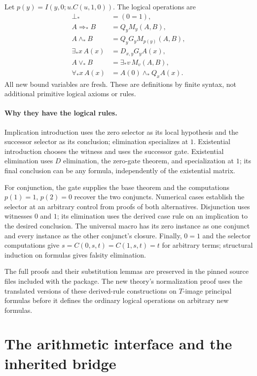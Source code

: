 \documentclass[11pt,a4paper]{article}
\theoremstyle{definition}
\begin{document}
Let $p(y)=I(y,0;u.C(u,1,0))$. The logical operations are
\[
\begin{aligned}
\bot_*&=(0=1),\\
A\Rightarrow_* B&=Q_y M_y(A,B),\\
A\wedge_* B&=Q_y G_y M_{p(y)}(A,B),\\
\exists_* x\,A(x)&=D_{x,y}G_y A(x),\\
A\vee_*B&=\exists_*v\,M_v(A,B),\\
\forall_*x\,A(x)&=A(0)\wedge_* Q_x A(x).
\end{aligned}
\]
All new bound variables are fresh. These are definitions by finite
syntax, not additional primitive logical axioms or rules.

\paragraph{Why they have the logical rules.}
Implication introduction uses the zero selector as its local hypothesis
and the successor selector as its conclusion; elimination specializes
at $1$. Existential introduction chooses the witness and uses the
successor gate. Existential elimination uses $D$ elimination, the
zero-gate theorem, and specialization at $1$; its final conclusion can
be any formula, independently of the existential matrix.

For conjunction, the gate supplies the base theorem and the computations
$p(1)=1$, $p(2)=0$ recover the two conjuncts. Numerical cases establish
the selector at an arbitrary control from proofs of both alternatives.
Disjunction uses witnesses $0$ and $1$; its elimination uses the derived
case rule on an implication to the desired conclusion. The universal
macro has its zero instance as one conjunct and every instance as the
other conjunct's closure. Finally, $0=1$ and the selector computations
give $s=C(0,s,t)=C(1,s,t)=t$ for arbitrary terms; structural induction
on formulas gives falsity elimination.

The full proofs and their substitution lemmas are preserved in the
pinned source files included with the package. The new theory's
normalization proof uses the translated versions of these derived-rule
constructions on $T$-image principal formulas before it defines the
ordinary logical operations on arbitrary new formulas.


\section{The arithmetic interface and the inherited bridge}
\label{app:arithmetic-bridge}
\end{document}
